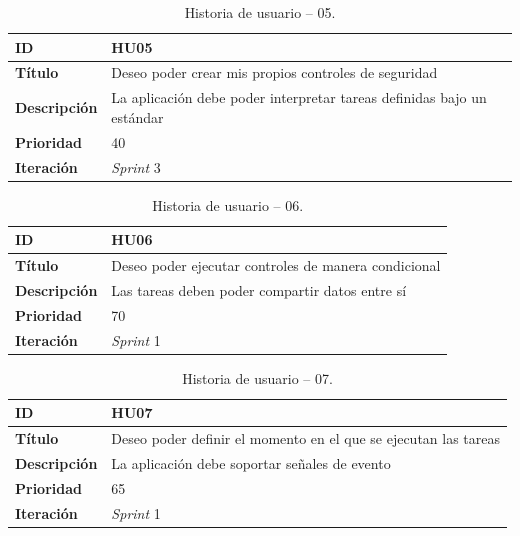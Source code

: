 \begin{table}[H]
    \begin{center}
        \begin{tabularx}{\textwidth}{| l | X |}
            \hline
            \textbf{ID}             & HU05 \\ \hline
            \textbf{Título}         & Deseo poder crear mis propios controles de seguridad \\ \hline
            \textbf{Descripción}    & La aplicación debe poder interpretar tareas definidas bajo un estándar \\ \hline
            \textbf{Prioridad}      & 40 \\ \hline
            \textbf{Iteración}      & \textit{Sprint} 3 \\ \hline
        \end{tabularx}
    \end{center}
    \caption{Historia de usuario -- 05.}
    \label{tab:hu05}
\end{table}

\begin{table}[H]
    \begin{center}
        \begin{tabularx}{\textwidth}{| l | X |}
            \hline
            \textbf{ID}             & HU06 \\ \hline
            \textbf{Título}         & Deseo poder ejecutar controles de manera condicional \\ \hline
            \textbf{Descripción}    & Las tareas deben poder compartir datos entre sí \\ \hline
            \textbf{Prioridad}      & 70 \\ \hline
            \textbf{Iteración}      & \textit{Sprint} 1\\ \hline
        \end{tabularx}
    \end{center}
    \caption{Historia de usuario -- 06.}
    \label{tab:hu06}
\end{table}

\begin{table}[H]
    \begin{center}
        \begin{tabularx}{\textwidth}{| l | X |}
            \hline
            \textbf{ID}             & HU07 \\ \hline
            \textbf{Título}         & Deseo poder definir el momento en el que se ejecutan las tareas \\ \hline
            \textbf{Descripción}    & La aplicación debe soportar señales de evento \\ \hline
            \textbf{Prioridad}      & 65 \\ \hline
            \textbf{Iteración}      & \textit{Sprint} 1\\ \hline
        \end{tabularx}
    \end{center}
    \caption{Historia de usuario -- 07.}
    \label{tab:hu07}
\end{table}



